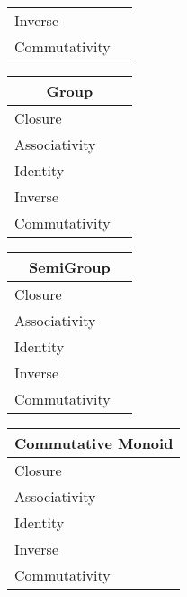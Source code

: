\documentclass[a4paper,12pt]{scrartcl}    %
\begin{document}
\begin{landscape}
\begin{minipage}[t][]{0.60 \linewidth}
\begin{minipage}[c]{0,5\textwidth}
\begin{tabular}{|l|p{2cm}|}
			    \cellcolor{red!25} Inverse&  \\
			    \cellcolor{red!25} Commutativity&  \\
			  \hline
			\end{tabular}
			\vfill
			\begin{tabular}{|l|p{2cm}|} %
			  \hline
			  \multicolumn{2}{c}{\cellcolor{yellow!25}Group} \\
			  \hline
			   \cellcolor{blue!25} Closure&  \\
			    \cellcolor{blue!25} Associativity&  \\
			    \cellcolor{blue!25} Identity&  \\
			    \cellcolor{blue!25} Inverse&  \\
			    \cellcolor{red!25} Commutativity&  \\
			  \hline
			\end{tabular}
		\end{minipage}
		\hspace{1cm}
		\begin{minipage}[c]{0,5\textwidth}	
\begin{tabular}{|l|p{2cm}|} %
			  \hline
			  \multicolumn{2}{c}{\cellcolor{yellow!25}SemiGroup} \\
			  \hline
			   \cellcolor{blue!25} Closure&  \\
			    \cellcolor{blue!25} Associativity&  \\
			    \cellcolor{red!25} Identity&  \\
			    \cellcolor{red!25} Inverse&  \\
			    \cellcolor{red!25} Commutativity&  \\
			  \hline
			\end{tabular}
			\vfill
			\begin{tabular}{|l|p{2cm}|} %
			  \hline
			  \multicolumn{2}{c}{\cellcolor{yellow!25}Commutative Monoid} \\
			  \hline
			   \cellcolor{blue!25} Closure&  \\
			    \cellcolor{blue!25} Associativity&  \\
			    \cellcolor{blue!25} Identity&  \\
			    \cellcolor{red!25} Inverse&  \\
			    \cellcolor{blue!25} Commutativity&  \\
			  \hline
			\end{tabular}
			\vfill
			\begin{tabular}{|l|p{2cm}|} %

\end{tabular}
\end{minipage}
\end{minipage}
\end{landscape}
\end{document}
